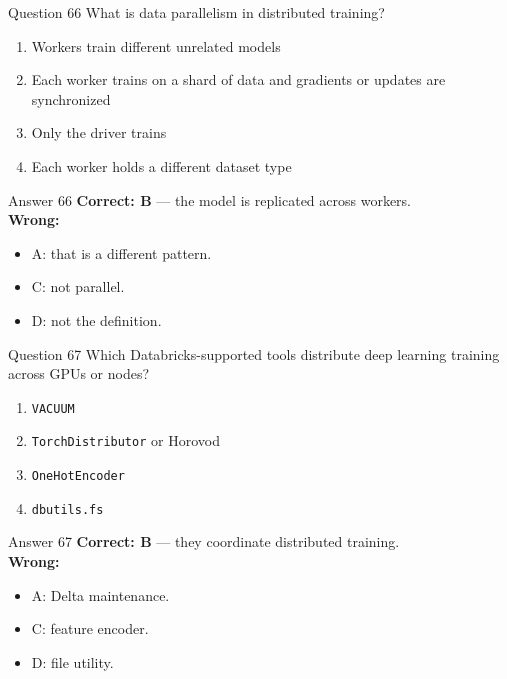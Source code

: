 \documentclass[aspectratio=169,11pt]{beamer}
\begin{document}
\begin{frame}{Question 66}
What is data parallelism in distributed training?
\begin{enumerate}[label=\Alph*.]
\item Workers train different unrelated models
\item Each worker trains on a shard of data and gradients or updates are synchronized
\item Only the driver trains
\item Each worker holds a different dataset type
\end{enumerate}
\end{frame}
\begin{frame}{Answer 66}
\textbf{Correct: B} --- the model is replicated across workers.\\
\vspace{0.5em}
\textbf{Wrong:}
\begin{itemize}
\item A: that is a different pattern.
\item C: not parallel.
\item D: not the definition.
\end{itemize}
\end{frame}

\begin{frame}{Question 67}
Which Databricks-supported tools distribute deep learning training across GPUs or nodes?
\begin{enumerate}[label=\Alph*.]
\item \texttt{VACUUM}
\item \texttt{TorchDistributor} or Horovod
\item \texttt{OneHotEncoder}
\item \texttt{dbutils.fs}
\end{enumerate}
\end{frame}
\begin{frame}{Answer 67}
\textbf{Correct: B} --- they coordinate distributed training.\\
\vspace{0.5em}
\textbf{Wrong:}
\begin{itemize}
\item A: Delta maintenance.
\item C: feature encoder.
\item D: file utility.
\end{itemize}
\end{frame}
\end{document}
